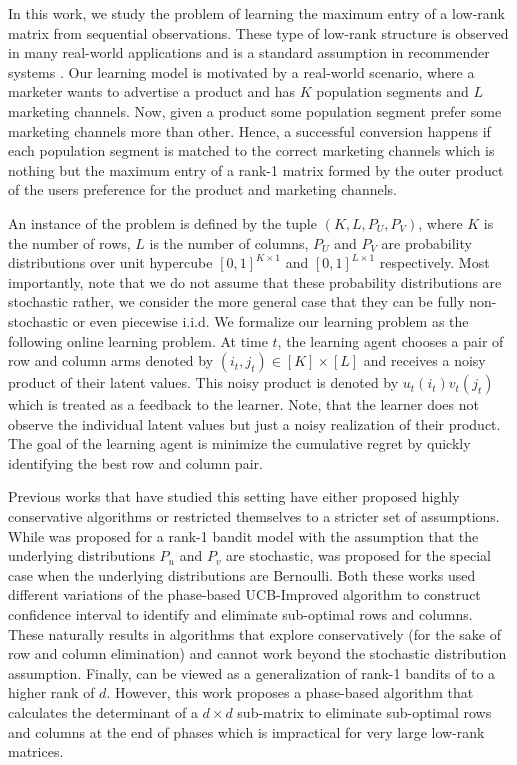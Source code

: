In this work, we study the problem of learning the maximum entry of a low-rank matrix from sequential observations. These type of low-rank structure is observed in many real-world applications and is a standard assumption in recommender systems \citep{koren2009matrix,ricci2011liorrokach}. Our learning model is motivated by a real-world scenario, where a marketer wants to advertise a product and has $K$ population segments and $L$ marketing channels. Now, given a product some population segment prefer some marketing channels more than other. Hence, a successful conversion happens if each population segment is matched to the correct marketing channels which is nothing but the maximum entry of a rank-1 matrix formed by the outer product of the users preference for the product and marketing channels.  



An instance of the problem is defined by the tuple $(K,L,P_U,P_V)$, where $K$ is the number of rows, $L$ is the number of columns, $P_U$ and $P_V$ are probability distributions over unit hypercube $[0,1]^{K\times 1}$ and $[0,1]^{L\times 1}$ respectively. Most importantly, note that we do not assume that these probability distributions are stochastic rather, we consider the more general case that they can be fully non-stochastic or even piecewise i.i.d. We formalize our learning problem as the following online learning problem. At time $t$, the learning agent chooses a pair of row and column arms denoted by $(i_t, j_t) \in [K]\times [L]$ and receives a noisy product of their latent values. This noisy product is denoted by $u_t(i_t)v_t(j_t)$ which is treated as a feedback to the learner. Note, that the learner does not observe the individual latent values but just a noisy realization of their product. The goal of the learning agent is minimize the cumulative regret by quickly identifying the best row and column pair.


Previous works that have studied this setting have either proposed highly conservative algorithms or restricted themselves to a stricter set of assumptions. While \citet{katariya2016stochastic} was proposed for a rank-1 bandit model with the assumption that the underlying distributions $P_u$ and $P_v$ are stochastic, \citet{katariya2017bernoulli} was proposed for the special case when the underlying distributions are Bernoulli. Both these works used different variations of the phase-based UCB-Improved \citep{auer2010ucb} algorithm to construct confidence interval to identify and eliminate sub-optimal rows and columns. These naturally results in algorithms that explore conservatively (for the sake of row and column elimination) and cannot work beyond the stochastic distribution assumption. Finally, \citet{kveton2017stochastic} can be viewed as a generalization of rank-1 bandits of \citet{katariya2016stochastic} to a higher rank of $d$. However, this work proposes a phase-based algorithm that calculates the determinant of a $d\times d$ sub-matrix to eliminate sub-optimal rows and columns at the end of phases which is impractical for very large low-rank matrices.


